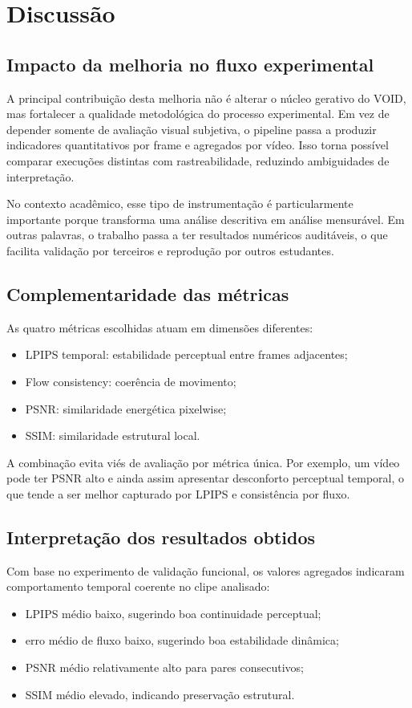 \documentclass[conference]{IEEEtran}
\begin{document}
\section{Discussão}
\subsection{Impacto da melhoria no fluxo experimental}
A principal contribuição desta melhoria não é alterar o núcleo gerativo do VOID, mas fortalecer a qualidade metodológica do processo experimental. Em vez de depender somente de avaliação visual subjetiva, o pipeline passa a produzir indicadores quantitativos por frame e agregados por vídeo. Isso torna possível comparar execuções distintas com rastreabilidade, reduzindo ambiguidades de interpretação.

No contexto acadêmico, esse tipo de instrumentação é particularmente importante porque transforma uma análise descritiva em análise mensurável. Em outras palavras, o trabalho passa a ter resultados numéricos auditáveis, o que facilita validação por terceiros e reprodução por outros estudantes.

\subsection{Complementaridade das métricas}
As quatro métricas escolhidas atuam em dimensões diferentes:
\begin{itemize}
    \item LPIPS temporal: estabilidade perceptual entre frames adjacentes;
    \item Flow consistency: coerência de movimento;
    \item PSNR: similaridade energética pixelwise;
    \item SSIM: similaridade estrutural local.
\end{itemize}

A combinação evita viés de avaliação por métrica única. Por exemplo, um vídeo pode ter PSNR alto e ainda assim apresentar desconforto perceptual temporal, o que tende a ser melhor capturado por LPIPS e consistência por fluxo.

\subsection{Interpretação dos resultados obtidos}
Com base no experimento de validação funcional, os valores agregados indicaram comportamento temporal coerente no clipe analisado:
\begin{itemize}
    \item LPIPS médio baixo, sugerindo boa continuidade perceptual;
    \item erro médio de fluxo baixo, sugerindo boa estabilidade dinâmica;
    \item PSNR médio relativamente alto para pares consecutivos;
    \item SSIM médio elevado, indicando preservação estrutural.
\end{itemize}
\end{document}
